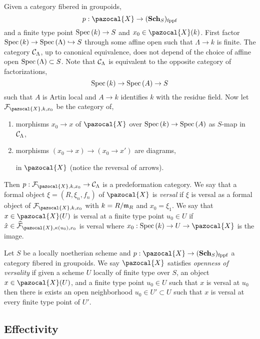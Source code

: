 \documentclass[12pt]{article}
\newcommand{\fppf}{\mathrm{fppf}}
\renewcommand{\X}{\pazocal{X}}
\renewcommand{\F}{\mathcal{F}}
\begin{document}
\begin{defn}
Given a category fibered in groupoids,
\[ p : \X \to (\Sch_S)_{\fppf} \]
and a finite type point $\mathrm{Spec}\left( k \right) \to S$ and $x_0 \in \X(k)$. First factor $\mathrm{Spec}\left( k \right) \to \mathrm{Spec}\left( \Lambda \right) \hookrightarrow S$ through some affine open such that $\Lambda \to k$ is finite. The category $\mathcal{C}_\Lambda$, up to canonical equivalence, does not depend of the choice of affine open $\mathrm{Spec}\left( \Lambda \right) \subset S$. Note that $\mathcal{C}_{\Lambda}$ is equivalent to the opposite category of factorizations,
\[ \mathrm{Spec}\left( k \right) \to \mathrm{Spec}\left( A \right) \to S \]
such that $A$ is Artin local and $A \to k$ identifies $k$ with the residue field. Now let $\F_{\X, k, x_0}$ be the category of,
\begin{enumerate}
\item morphisms $x_0 \to x$ of $\X$ over $\mathrm{Spec}\left( k \right) \to \mathrm{Spec}\left( A \right)$ as $S$-map in $\mathcal{C}_{\Lambda}$,
\item morphisms $(x_0 \to x) \to (x_0 \to x')$ are diagrams,
\begin{center}
\end{center}
in $\X$ (notice the reversal of arrows). 
\end{enumerate}
Then $p : \F_{\X, k, x_0} \to \C_{\Lambda}$ is a predeformation category. We say that a formal object $\xi = (R, \xi_n, f_n)$ of $\X$ is \textit{versal} if $\xi$ is versal as a formal object of $\F_{\X, k, x_0}$ with $k = R / \mathfrak{m}_R$ and $x_0 = \xi_1$. We say that $x \in \X(U)$ is versal at a finite type point $u_0 \in U$ if $\hat{x} \in \wh{\F}_{\X, \kappa(u_0), x_0}$ is versal where $x_0 : \Spec{k} \to U \to \X$ is the image. 
\end{defn}

\begin{defn}
Let $S$ be a locally noetherian scheme and $p : \X \to (\Sch_S)_{\fppf}$ a category fibered in groupoids. We say $\X$ satisfies \textit{openness of versality} if given a scheme $U$ locally of finite type over $S$, an object $x \in \X(U)$, and a finite type point $u_0 \in U$ such that $x$ is versal at $u_0$ then there is exists an open neighborhood $u_0 \in U' \subset U$ such that $x$ is versal at every finite type point of $U'$.
\end{defn}

\subsection{Effectivity}
\end{document}
